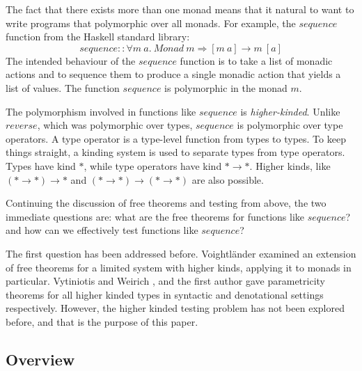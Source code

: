 \documentclass{llncs}
\begin{document}
The fact that there exists more than one monad means that it natural
to want to write programs that polymorphic over all monads. For
example, the $\mathit{sequence}$ function from the Haskell standard
library:
\begin{displaymath}
  \mathit{sequence} :: \forall m~a.~\mathit{Monad}~m \Rightarrow [m~a] \to m~[a]
\end{displaymath}
The intended behaviour of the $\mathit{sequence}$ function is to take
a list of monadic actions and to sequence them to produce a single
monadic action that yields a list of values. The function
$\mathit{sequence}$ is polymorphic in the monad $m$.

The polymorphism involved in functions like $\mathit{sequence}$ is
\emph{higher-kinded}. Unlike $\mathit{reverse}$, which was polymorphic
over types, $\mathit{sequence}$ is polymorphic over type operators. A
type operator is a type-level function from types to types. To keep
things straight, a kinding system is used to separate types from type
operators. Types have kind $*$, while type operators have kind
$* \to *$. Higher kinds, like $(* \to *) \to *$ and
$(* \to *) \to (* \to *)$ are also possible.

Continuing the discussion of free theorems and testing from above, the
two immediate questions are: what are the free theorems for functions
like $\mathit{sequence}$? and how can we effectively test functions
like $\mathit{sequence}$?

The first question has been addressed before. Voightl{\"a}nder
\cite{DBLP:journals/jfp/VytiniotisW10} examined an extension of free
theorems for a limited system with higher kinds, applying it to monads
in particular. Vytiniotis and Weirich
\cite{DBLP:journals/jfp/VytiniotisW10}, and the first author
\cite{atkey12relational} gave parametricity theorems for all higher
kinded types in syntactic and denotational settings
respectively. However, the higher kinded testing problem has not been
explored before, and that is the purpose of this paper.

\subsection{Overview}


\end{document}
